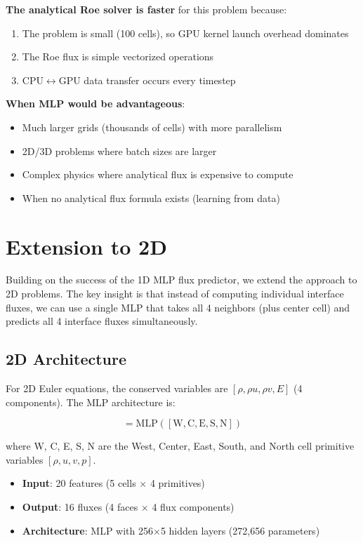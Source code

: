 \documentclass[11pt,a4paper]{article}
\begin{document}
\textbf{The analytical Roe solver is faster} for this problem because:
\begin{enumerate}
    \item The problem is small (100 cells), so GPU kernel launch overhead dominates
    \item The Roe flux is simple vectorized operations
    \item CPU$\leftrightarrow$GPU data transfer occurs every timestep
\end{enumerate}

\textbf{When MLP would be advantageous}:
\begin{itemize}
    \item Much larger grids (thousands of cells) with more parallelism
    \item 2D/3D problems where batch sizes are larger
    \item Complex physics where analytical flux is expensive to compute
    \item When no analytical flux formula exists (learning from data)
\end{itemize}

\section{Extension to 2D}

Building on the success of the 1D MLP flux predictor, we extend the approach to 2D problems. The key insight is that instead of computing individual interface fluxes, we can use a single MLP that takes all 4 neighbors (plus center cell) and predicts all 4 interface fluxes simultaneously.

\subsection{2D Architecture}

For 2D Euler equations, the conserved variables are $[\rho, \rho u, \rho v, E]$ (4 components). The MLP architecture is:

\begin{equation}
    [F_w, F_e, G_s, G_n] = \text{MLP}([\text{W}, \text{C}, \text{E}, \text{S}, \text{N}])
\end{equation}

where W, C, E, S, N are the West, Center, East, South, and North cell primitive variables $[\rho, u, v, p]$.

\begin{itemize}
    \item \textbf{Input}: 20 features (5 cells $\times$ 4 primitives)
    \item \textbf{Output}: 16 fluxes (4 faces $\times$ 4 flux components)
    \item \textbf{Architecture}: MLP with 256$\times$5 hidden layers (272,656 parameters)
\end{itemize}
\end{document}
